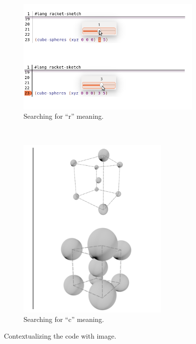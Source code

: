 \begin{figure}[htb]
 \vspace{-10pt}
    \centering
        \begin{subfigure}{0.7\textwidth}
                \includegraphics[width=\textwidth]{img/cube}
                \caption{Searching for ``r'' meaning.}
                \label{fig:img-code1}
        \end{subfigure}%
        ~ %
        \begin{subfigure}{0.3\textwidth}
                \includegraphics[width=\textwidth]{img/img-cube}
                \caption{Searching for ``c'' meaning.}
        \end{subfigure}
        \caption{Contextualizing the code with image.}
        \label{fig:cube}
 \vspace{-10pt}
\end{figure}


